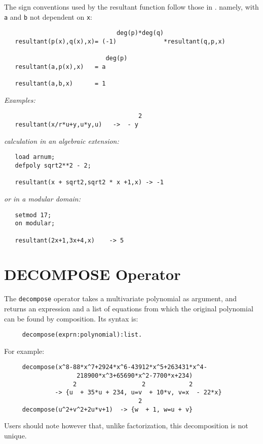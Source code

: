 The sign conventions used by the resultant function follow those in \cite{Loos:1982}.
namely, with \texttt{a} and \texttt{b} not dependent on \texttt{x}:

\begin{verbatim}
                               deg(p)*deg(q)
   resultant(p(x),q(x),x)= (-1)             *resultant(q,p,x)

                            deg(p)
   resultant(a,p(x),x)   = a

   resultant(a,b,x)      = 1
\end{verbatim}

\textit{Examples:}

\begin{samepage}
\begin{verbatim}
                                     2
   resultant(x/r*u+y,u*y,u)   ->  - y
\end{verbatim}
\end{samepage}

\textit{calculation in an algebraic extension:}

\begin{samepage}
\begin{verbatim}
   load arnum;
   defpoly sqrt2**2 - 2;

   resultant(x + sqrt2,sqrt2 * x +1,x) -> -1
\end{verbatim}
\end{samepage}

\textit{or in a modular domain:}

\begin{samepage}
\begin{verbatim}
   setmod 17;
   on modular;

   resultant(2x+1,3x+4,x)    -> 5
\end{verbatim}
\end{samepage}
\section{DECOMPOSE Operator}
\hypertarget{operator:DECOMPOSE}{}

The \texttt{decompose} operator takes a multivariate polynomial as argument,
and returns an expression and a list of equations from which the
original polynomial can be found by composition.  Its syntax is:
\begin{verbatim}
     decompose(exprn:polynomial):list.
\end{verbatim}
For example:
\begin{verbatim}
     decompose(x^8-88*x^7+2924*x^6-43912*x^5+263431*x^4-
                    218900*x^3+65690*x^2-7700*x+234)
                   2                  2            2
              -> {u  + 35*u + 234, u=v  + 10*v, v=x  - 22*x}
                                     2
     decompose(u^2+v^2+2u*v+1)  -> {w  + 1, w=u + v}
\end{verbatim}
Users should note however that, unlike factorization, this decomposition
is not unique.

